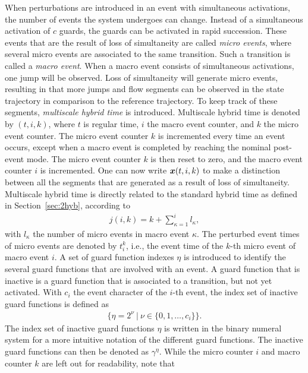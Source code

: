 \documentclass[../DC2017114Bouma.tex]{subfiles}
\begin{document}
When perturbations are introduced in an event with simultaneous activations, the number of events the system undergoes can change. Instead of a simultaneous activation of $c$ guards, the guards can be activated in rapid succession. These events that are the result of loss of simultaneity are called \textit{micro events}, where several micro events are associated to the same transition. Such a transition is called a \textit{macro event}. When a macro event consists of simultaneous activations, one jump will be observed. Loss of simultaneity will generate micro events, resulting in that more jumps and flow segments can be observed in the state trajectory in comparison to the reference trajectory. To keep track of these segments, \textit{multiscale hybrid time} is introduced. Multiscale hybrid time is denoted by $(t,i,k)$, where $t$ is regular time, $i$ the macro event counter, and $k$ the micro event counter. The micro event counter $k$ is incremented every time an event occurs, except when a macro event is completed by reaching the nominal post-event mode. The micro event counter $k$ is then reset to zero, and the macro event counter $i$ is incremented. One can now write ${\boldsymbol{x}}(t,i,k)$ to make a distinction between all the segments that are generated as a result of loss of simultaneity. Multiscale hybrid time is directly related to the standard hybrid time as defined in Section~\ref{sec:2hyb}, according to
\begin{align}
j(i,k) = k + \sum_{\kappa=1}^{i}l_\kappa,
\end{align}
with $l_\kappa$ the number of micro events in macro event $\kappa$. The perturbed event times of micro events are denoted by $t^k_i$, i.e., the event time of the $k$-th micro event of macro event $i$. A set of guard function indexes $\eta$ is introduced to identify the several guard functions that are involved with an event. A guard function that is inactive is a guard function that is associated to a transition, but not yet activated. With $c_i$ the event character of the $i$-th event, the index set of inactive guard functions is defined as
\begin{align}
\big\{\eta = 2^{\nu}\ |\ \nu\in\{0,1,\dots,c_i\}\big\}.\label{eq:4eta}
\end{align}
The index set of inactive guard functions $\eta$ is written in the binary numeral system for a more intuitive notation of the different guard functions. The inactive guard functions can then be denoted as $\gamma^\eta$. While the micro counter $i$ and macro counter $k$ are left out for readability, note that
\end{document}
